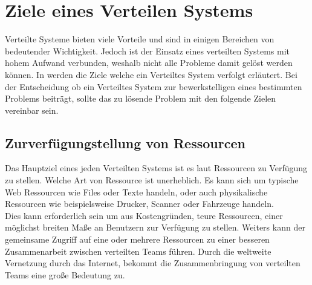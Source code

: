 \section{Ziele eines Verteilen Systems}\label{sec:distributedSystems:goales}
Verteilte Systeme bieten viele Vorteile und sind in einigen Bereichen von bedeutender Wichtigkeit. Jedoch ist der Einsatz eines verteilten Systems mit hohem Aufwand verbunden, weshalb nicht alle Probleme damit gelöst werden können. In \cite{tanenbaum2007distributed} werden die Ziele welche ein Verteiltes System verfolgt erläutert. Bei der Entscheidung ob ein Verteiltes System zur bewerkstelligen eines bestimmten Problems beiträgt, sollte das zu lösende Problem mit den folgende Zielen vereinbar sein.

\subsection{Zurverfügungstellung von Ressourcen}\label{sec:distributedSystems:goales:resourceAccess} Das Hauptziel eines jeden Verteilten Systems ist es laut \cite{tanenbaum2007distributed} Ressourcen zu Verfügung zu stellen. Welche Art von Ressource ist unerheblich. Es kann sich um typische Web Ressourcen wie Files oder Texte handeln, oder auch physikalische Ressourcen wie beispielsweise Drucker, Scanner oder Fahrzeuge handeln.\\
Dies kann erforderlich sein um aus Kostengründen, teure Ressourcen, einer möglichst breiten Maße an Benutzern zur Verfügung zu stellen. Weiters kann der gemeinsame Zugriff auf eine oder mehrere Ressourcen zu einer besseren Zusammenarbeit zwischen verteilten Teams führen. Durch die weltweite Vernetzung durch das Internet, bekommt die Zusammenbringung von verteilten Teams eine große Bedeutung zu. 
